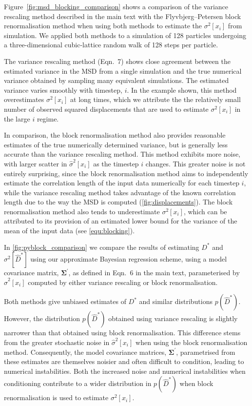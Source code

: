 \documentclass[reprint,superscriptaddress,nobibnotes,amsmath,amssymb,aps,prx,hidelinks]{revtex4-2}
\newcommand{\oMSDi}{\ensuremath{x_i}}
\newcommand{\prob}[1]{\ensuremath{p(#1)}}
\newcommand{\Dest}{\ensuremath{\widehat{D}^*}}
\newcommand{\D}{\ensuremath{D^*}}
\newcommand{\var}[1]{\ensuremath{\sigma^2[#1]}}
\newcommand{\varest}[1]{\ensuremath{\widehat{\sigma}^2[#1]}}
\begin{document}
Figure~\ref{fig:msd_blocking_comparison} shows a comparison of the variance rescaling method described in the main text with the Flyvbjerg--Petersen block renormalisation method when using both methods to estimate the $\var{\oMSDi}$ from simulation.
We applied both methods to a simulation of \num{128} particles undergoing a three-dimensional cubic-lattice random walk of \num{128} steps per particle. 

The variance rescaling method (Eqn.~7) shows close agreement between the estimated variance in the MSD from a single simulation and the true numerical variance obtained by sampling many equivalent simulations.
The estimated variance varies smoothly with timestep, $i$.
In the example shown, this method overestimates $\var{\oMSDi}$ at long times, which we attribute the the relatively small number of observed squared displacements that are used to estimate $\var{\oMSDi}$ in the large $i$ regime.

In comparison, the block renormalisation method also provides reasonable estimates of the true numerically determined variance, but is generally less accurate than the variance rescaling method.
This method exhibits more noise, with larger scatter in $\varest{\oMSDi}$ as the timestep $i$ changes.
This greater noise is not entirely surprising, since the block renormalisation method aims to independently estimate the correlation length of the input data numerically for each timestep $i$, while the variance rescaling method takes advantage of the known correlation length due to the way the MSD is computed (\cref{fig:displacements}).
The block renormalisation method also tends to underestimate $\var{\oMSDi}$, which can be attributed to its provision of an estimated lower bound for the variance of the mean of the input data (see \cref{equ:blocking}).

In \cref{fig:pyblock_comparison} we compare the results of estimating $\D$ and $\var{\Dest}$ using our approximate Bayesian regression scheme, using a model covariance matrix, $\mathbf{\Sigma^\prime}$, as defined in Eqn.~6 in the main text, parameterised by $\varest{\oMSDi}$ computed by either variance rescaling or block renormalisation.

Both methods give unbiased estimates of $\D$ and similar distributions $\prob{\Dest}$.
However, the distribution $\prob{\Dest}$ obtained using variance rescaling is slightly narrower than that obtained using block renormalisation.
This difference stems from the greater stochastic noise in $\varest{\oMSDi}$ when using the block renormalisation method.
Consequently, the model covariance matrices, $\mathbf{\Sigma^\prime}$, parametrised from these estimates are themselves noisier and often difficult to condition, leading to numerical instabilities.
Both the increased noise and numerical instabilities when conditioning contribute to a wider distribution in $\prob{\Dest}$ when block renormalisation is used to estimate $\var{\oMSDi}$.
\end{document}

